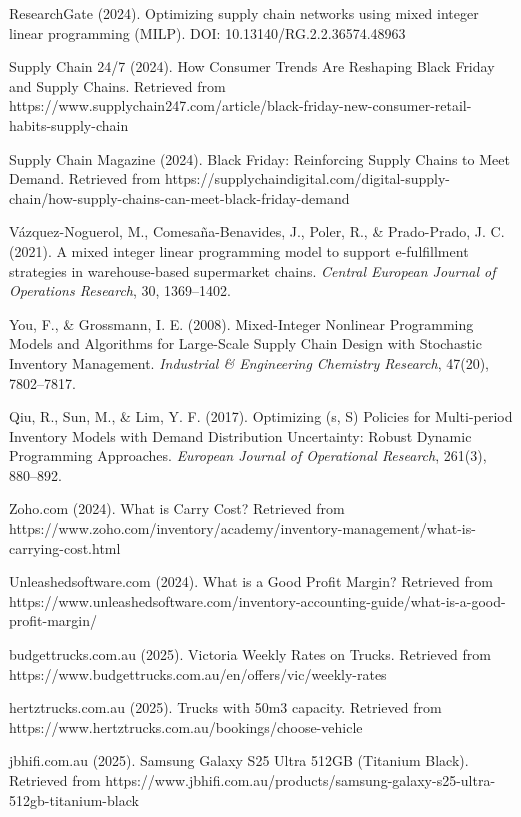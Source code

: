 \documentclass[a4paper,12pt]{article}
\begin{document}
\begin{thebibliography}{99}
ResearchGate (2024).
Optimizing supply chain networks using mixed integer linear programming (MILP).
DOI: 10.13140/RG.2.2.36574.48963

Supply Chain 24/7 (2024).
How Consumer Trends Are Reshaping Black Friday and Supply Chains.
Retrieved from https://www.supplychain247.com/article/black-friday-new-consumer-retail-habits-supply-chain

Supply Chain Magazine (2024).
Black Friday: Reinforcing Supply Chains to Meet Demand.
Retrieved from https://supplychaindigital.com/digital-supply-chain/how-supply-chains-can-meet-black-friday-demand

Vázquez-Noguerol, M., Comesaña-Benavides, J., Poler, R., \& Prado-Prado, J. C. (2021).
A mixed integer linear programming model to support e-fulfillment strategies in warehouse-based supermarket chains. \textit{Central European Journal of Operations Research}, 30, 1369--1402.

You, F., \& Grossmann, I. E. (2008).
Mixed-Integer Nonlinear Programming Models and Algorithms for Large-Scale Supply Chain Design with Stochastic Inventory Management. \textit{Industrial \& Engineering Chemistry Research}, 47(20), 7802--7817.

Qiu, R., Sun, M., \& Lim, Y. F. (2017).
Optimizing (s, S) Policies for Multi-period Inventory Models with Demand Distribution Uncertainty: Robust Dynamic Programming Approaches. \textit{European Journal of Operational Research}, 261(3), 880--892.

Zoho.com (2024).
What is Carry Cost?
Retrieved from https://www.zoho.com/inventory/academy/inventory-management/what-is-carrying-cost.html

Unleashedsoftware.com (2024).
What is a Good Profit Margin?
Retrieved from https://www.unleashedsoftware.com/inventory-accounting-guide/what-is-a-good-profit-margin/

budgettrucks.com.au (2025).
Victoria Weekly Rates on Trucks.
Retrieved from https://www.budgettrucks.com.au/en/offers/vic/weekly-rates

hertztrucks.com.au (2025).
Trucks with 50m3 capacity.
Retrieved from https://www.hertztrucks.com.au/bookings/choose-vehicle

jbhifi.com.au (2025).
Samsung Galaxy S25 Ultra 512GB (Titanium Black).
Retrieved from https://www.jbhifi.com.au/products/samsung-galaxy-s25-ultra-512gb-titanium-black


\end{thebibliography}
\end{document}
